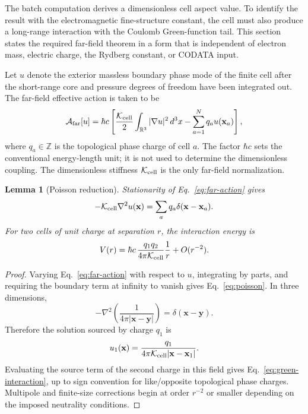 \documentclass[11pt]{article}
\newcommand{\Kcell}{\mathcal K_{\rm cell}}
\newcommand{\Afar}{\mathcal A_{\rm far}}
\newtheorem{lemma}{Lemma}
\begin{document}
The batch computation derives a dimensionless cell aspect value. To identify the result with the electromagnetic fine-structure constant, the cell must also produce a long-range interaction with the Coulomb Green-function tail. This section states the required far-field theorem in a form that is independent of electron mass, electric charge, the Rydberg constant, or CODATA input.

Let \(u\) denote the exterior massless boundary phase mode of the finite cell after the short-range core and pressure degrees of freedom have been integrated out. The far-field effective action is taken to be
\begin{equation}
\Afar[u]
=
\hbar c\left[
\frac{\Kcell}{2}
\int_{\mathbb R^3} |\nabla u|^2\,d^3x
-
\sum_{a=1}^{N} q_a u(\mathbf x_a)
\right],
\label{eq:far-action}
\end{equation}
where \(q_a\in\mathbb Z\) is the topological phase charge of cell \(a\). The factor \(\hbar c\) sets the conventional energy-length unit; it is not used to determine the dimensionless coupling. The dimensionless stiffness \(\Kcell\) is the only far-field normalization.

\begin{lemma}[Poisson reduction]
Stationarity of Eq.~\eqref{eq:far-action} gives
\begin{equation}
-\Kcell \nabla^2 u(\mathbf x)=\sum_a q_a\delta(\mathbf x-\mathbf x_a).
\label{eq:poisson}
\end{equation}
For two cells of unit charge at separation \(r\), the interaction energy is
\begin{equation}
V(r)=\hbar c\,\frac{q_1q_2}{4\pi\Kcell}\frac{1}{r}+O(r^{-2}).
\label{eq:green-interaction}
\end{equation}
\end{lemma}

\begin{proof}
Varying Eq.~\eqref{eq:far-action} with respect to \(u\), integrating by parts, and requiring the boundary term at infinity to vanish gives Eq.~\eqref{eq:poisson}. In three dimensions,
\begin{equation}
-\nabla^2\left(\frac{1}{4\pi |\mathbf x-\mathbf y|}\right)=\delta(\mathbf x-\mathbf y).
\end{equation}
Therefore the solution sourced by charge \(q_1\) is
\begin{equation}
u_1(\mathbf x)=\frac{q_1}{4\pi\Kcell |\mathbf x-\mathbf x_1|}.
\end{equation}
Evaluating the source term of the second charge in this field gives Eq.~\eqref{eq:green-interaction}, up to sign convention for like/opposite topological phase charges. Multipole and finite-size corrections begin at order \(r^{-2}\) or smaller depending on the imposed neutrality conditions.
\end{proof}
\end{document}
